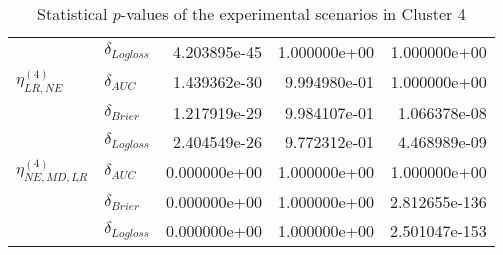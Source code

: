 \begin{table}[!h]
\begin{tabular}{l|lrrr}
                              & $\delta_{Logloss}$ &           4.203895e-45 &     1.000000e+00 &             1.000000e+00 \\
    $\eta^{(4)}_{LR, NE}$ & $\delta_{AUC}$ &           1.439362e-30 &     9.994980e-01 &             1.000000e+00 \\
                              & $\delta_{Brier}$ &           1.217919e-29 &     9.984107e-01 &             1.066378e-08 \\
                              & $\delta_{Logloss}$ &           2.404549e-26 &     9.772312e-01 &             4.468989e-09 \\
    $\eta^{(4)}_{NE, MD, LR}$ & $\delta_{AUC}$ &           0.000000e+00 &     1.000000e+00 &             1.000000e+00 \\
                              & $\delta_{Brier}$ &           0.000000e+00 &     1.000000e+00 &            2.812655e-136 \\
                              & $\delta_{Logloss}$ &           0.000000e+00 &     1.000000e+00 &            2.501047e-153 \\
    \bottomrule
    \end{tabular}
    \caption{Statistical $p$-values of the experimental scenarios in Cluster 4}
    \end{table}
    
